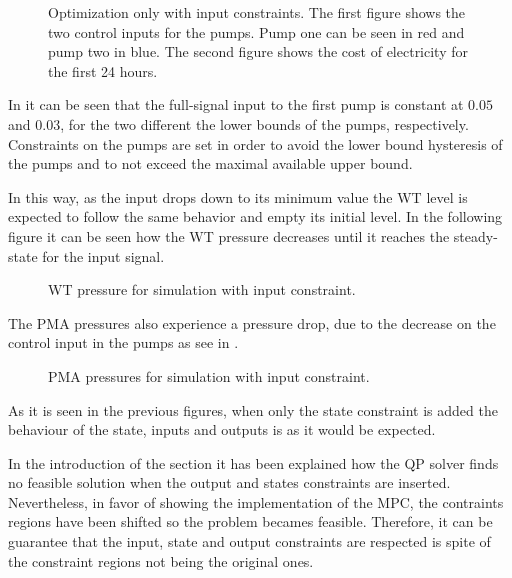 \begin{figure}[H]
\centering
 
\caption{Optimization only with input constraints. The first figure shows the two control inputs for the pumps. Pump one can be seen in red and pump two in blue. The second figure shows the cost of electricity for the first 24 hours.}
\label{fig:Implementation_shit}
\end{figure}

In  it can be seen that the full-signal input to the first pump is constant at $0.05$ and $0.03$, for the two different the lower bounds of the pumps, respectively. Constraints on the pumps are set in order to avoid the lower bound hysteresis of the pumps and to not exceed the maximal available upper bound. 

In this way, as the input drops down to its minimum value the WT level is expected to follow the same behavior and empty its initial level. In the following figure it can be seen how the WT pressure decreases until it reaches the steady-state for the input signal.

\begin{figure}[H]
\centering
 
\caption{WT pressure for simulation with input constraint.}
\label{fig:WT_input}
\end{figure}

The PMA pressures also experience a pressure drop, due to the decrease on the control input in the pumps as see in .

\begin{figure}[H]
\centering
 
\caption{PMA pressures for simulation with input constraint.}
\label{fig:Output_input}
\end{figure}

As it is seen in the previous figures, when only the state constraint is added the behaviour of the state, inputs and outputs is as it would be expected. 

In the introduction of the section it has been explained how the QP solver finds no feasible solution when the output and states constraints are inserted. Nevertheless, in favor of showing the implementation of the MPC, the contraints regions have been shifted so the problem becames feasible. Therefore, it can be guarantee that the input, state and output constraints are respected is spite of the constraint regions not being the original ones. 

